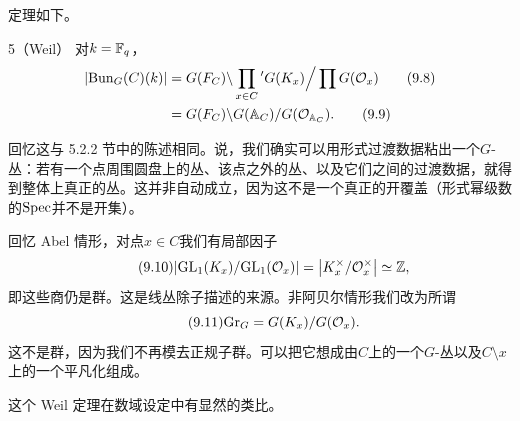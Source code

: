 定理如下。

\begin{srcthm}{5}（Weil）
对$k=\mathbb{F}_q$，
\begin{align}
|\mathrm{Bun}_G(C)(k)|&=G(F_C)\backslash\prod_{x\in C}{}^{\prime}G(K_x)\Big/\prod G(\mathcal{O}_x)\tag{9.8}\\
&=G(F_C)\backslash G(\mathbb{A}_C)/G(\mathcal{O}_{\mathbb{A}_C}).\tag{9.9}
\end{align}
\end{srcthm}

回忆这与 5.2.2 节中的陈述相同。说，我们确实可以用形式过渡数据粘出一个$G$-丛：若有一个点周围圆盘上的丛、该点之外的丛、以及它们之间的过渡数据，就得到整体上真正的丛。这并非自动成立，因为这不是一个真正的开覆盖（形式幂级数的$\mathrm{Spec}$并不是开集）。

回忆 Abel 情形，对点$x\in C$我们有局部因子
\begin{equation}\tag{9.10}
|\mathrm{GL}_1(K_x)/\mathrm{GL}_1(\mathcal{O}_x)|=\bigl|K_x^{\times}/\mathcal{O}_x^{\times}\bigr|\simeq\mathbb{Z},
\end{equation}
即这些商仍是群。这是线丛除子描述的来源。非阿贝尔情形我们改为所谓
\begin{equation}\tag{9.11}
\mathrm{Gr}_G=G(K_x)/G(\mathcal{O}_x).
\end{equation}
这不是群，因为我们不再模去正规子群。可以把它想成由$C$上的一个$G$-丛以及$C\setminus x$上的一个平凡化组成。

这个 Weil 定理在数域设定中有显然的类比。

